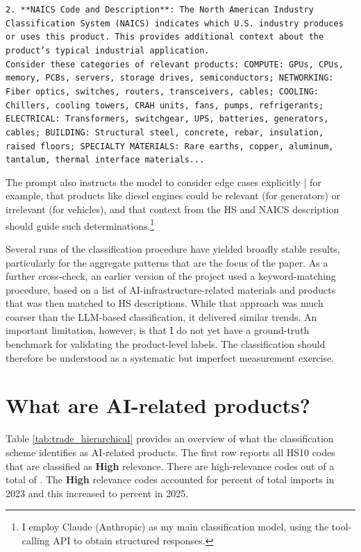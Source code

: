 \documentclass[12pt,pdftex]{article}
\newenvironment{prompt}{\par\medskip\noindent}{\par\medskip}
\begin{document}
\begin{onehalfspacing}
\begin{prompt}
\texttt{2. **NAICS Code and Description**: The North American Industry Classification System (NAICS) indicates which U.S. industry produces or uses this product. This provides additional context about the product's typical industrial application.}\\

\texttt{Consider these categories of relevant products: COMPUTE: GPUs, CPUs, memory, PCBs, servers, storage drives, semiconductors; NETWORKING: Fiber optics, switches, routers, transceivers, cables; COOLING: Chillers, cooling towers, CRAH units, fans, pumps, refrigerants; ELECTRICAL: Transformers, switchgear, UPS, batteries, generators, cables; BUILDING: Structural steel, concrete, rebar, insulation, raised floors; SPECIALTY MATERIALS: Rare earths, copper, aluminum, tantalum, thermal interface materials...}
\end{prompt}
The prompt also instructs the model to consider edge cases explicitly | for example, that products like diesel engines could be relevant (for generators) or irrelevant (for vehicles), and that context from the HS and NAICS description should guide such determinations.\footnote{I employ Claude (Anthropic) as my main classification model, using the tool-calling API to obtain structured responses.}

Several runs of the classification procedure have yielded broadly stable results, particularly for the aggregate patterns that are the focus of the paper. As a further cross-check, an earlier version of the project used a keyword-matching procedure, based on a list of AI-infrastructure-related materials and products that was then matched to HS descriptions. While that approach was much coarser than the LLM-based classification, it delivered similar trends. An important limitation, however, is that I do not yet have a ground-truth benchmark for validating the product-level labels. The classification should therefore be understood as a systematic but imperfect measurement exercise.

\afterpage{%
\clearpage

}

\section{What are AI-related products?}\label{sec:what-are-ai-products}

Table \ref{tab:trade_hierarchical} provides an overview of what the classification scheme identifies as AI-related products. The first row reports all HS10 codes that are classified as \textbf{High} relevance. There are \totalHighAiHsCodes{} high-relevance codes out of a total of \totalTradeHsCodes{}. The \textbf{High} relevance codes accounted for \aiShareTwentyThree{} percent of total imports in 2023 and this increased to \aiShareTwentyFive{} percent in 2025.


\end{onehalfspacing}
\end{document}
